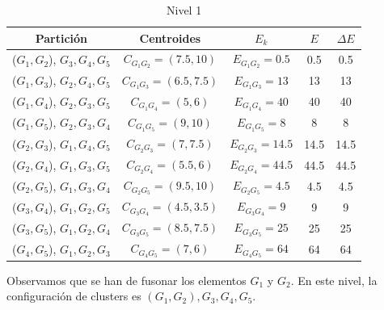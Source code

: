 \begin{ejemplo}
    \begin{table}[h]
        \small
        \centering
        \begin{tabular}{| c | c | c | c | c |}
            \hline
            \textbf{Partición} & \textbf{Centroides} & \(E_{k}\) & \(E\) & \(\Delta E\) \\
            \hline
            (\(G_{1}, G_{2}\)), \(G_{3}, G_{4}, G_{5}\) & \(C_{G_{1}G_{2}} = (7.5, 10)\) & \(E_{G_{1}G_{2}} = 0.5\) & 0.5 & 0.5 \\
            \hline
            (\(G_{1}, G_{3}\)), \(G_{2}, G_{4}, G_{5}\) & \(C_{G_{1}G_{3}} = (6.5, 7.5)\) & \(E_{G_{1}G_{3}} = 13\) & 13 & 13 \\
            \hline
            (\(G_{1}, G_{4}\)), \(G_{2}, G_{3}, G_{5}\) & \(C_{G_{1}G_{4}} = (5, 6)\) & \(E_{G_{1}G_{4}} = 40\) & 40 & 40 \\
            \hline
            (\(G_{1}, G_{5}\)), \(G_{2}, G_{3}, G_{4}\) & \(C_{G_{1}G_{5}} = (9, 10)\) & \(E_{G_{1}G_{5}} = 8\) & 8 & 8 \\
            \hline
            (\(G_{2}, G_{3}\)), \(G_{1}, G_{4}, G_{5}\) & \(C_{G_{2}G_{3}} = (7, 7.5)\) & \(E_{G_{2}G_{3}} = 14.5\) & 14.5 & 14.5 \\
            \hline
            (\(G_{2}, G_{4}\)), \(G_{1}, G_{3}, G_{5}\) & \(C_{G_{2}G_{4}} = (5.5, 6)\) & \(E_{G_{2}G_{4}} = 44.5\) & 44.5 & 44.5 \\
            \hline
            (\(G_{2}, G_{5}\)), \(G_{1}, G_{3}, G_{4}\) & \(C_{G_{2}G_{5}} = (9.5, 10)\) & \(E_{G_{2}G_{5}} = 4.5\) & 4.5 & 4.5 \\
            \hline
            (\(G_{3}, G_{4}\)), \(G_{1}, G_{2}, G_{5}\) & \(C_{G_{3}G_{4}} = (4.5, 3.5)\) & \(E_{G_{3}G_{4}} = 9\) & 9 & 9 \\
            \hline
            (\(G_{3}, G_{5}\)), \(G_{1}, G_{2}, G_{4}\) & \(C_{G_{3}G_{5}} = (8.5, 7.5)\) & \(E_{G_{3}G_{5}} = 25\) & 25 & 25 \\
            \hline
            (\(G_{4}, G_{5}\)), \(G_{1}, G_{2}, G_{3}\) & \(C_{G_{4}G_{5}} = (7, 6)\) & \(E_{G_{4}G_{5}} = 64\) & 64 & 64 \\
            \hline
        \end{tabular}
        \caption{Nivel 1}
        
    \end{table}

    Observamos que se han de fusonar los elementos $G_{1}$ y $G_{2}$. En este nivel, la configuración de clusters es $(G_{1},G_{2}),G_{3},G_{4},G_{5}$. \newline


\end{ejemplo}
